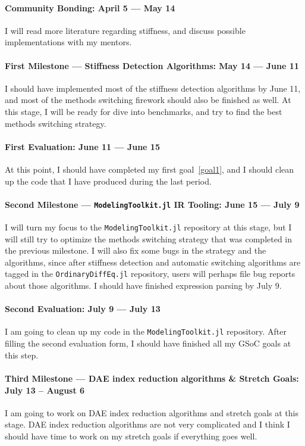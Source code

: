 \documentclass[12pt,a4paper]{article}
\begin{document}
\paragraph{Community Bonding: April 5 --- May 14}
I will read more literature regarding stiffness, and discuss possible
implementations with my mentors.

\paragraph{First Milestone --- Stiffness Detection Algorithms: May 14 --- June
11}
I should have implemented most of the stiffness detection algorithms by June
11, and most of the methods switching firework should also be finished as well.
At this stage, I will be ready for dive into benchmarks, and try to find the
best methods switching strategy.

\paragraph{First Evaluation: June 11 --- June 15}
At this point, I should have completed my first goal~\ref{goal1}, and I should
clean up the code that I have produced during the last period.

\paragraph{Second Milestone --- \texttt{ModelingToolkit.jl} IR Tooling: June 15
--- July 9}
I will turn my focus to the \texttt{ModelingToolkit.jl} repository at this
stage, but I will still try to optimize the methods switching strategy that was
completed in the previous milestone. I will also fix some bugs in the strategy
and the algorithms, since after stiffness detection and automatic switching
algorithms are tagged in the \texttt{OrdinaryDiffEq.jl} repository, users will
perhaps file bug reports about those algorithms. I should have finished
expression parsing by July 9.

\paragraph{Second Evaluation: July 9 --- July 13}
I am going to clean up my code in the \texttt{ModelingToolkit.jl} repository.
After filling the second evaluation form, I should have finished all my GSoC
goals at this step.

\paragraph{Third Milestone --- DAE index reduction algorithms \& Stretch Goals:
July 13 -- August 6}
I am going to work on DAE index reduction algorithms and stretch goals at this
stage. DAE index reduction algorithms are not very complicated and I think I
should have time to work on my stretch goals if everything goes well.
\end{document}
